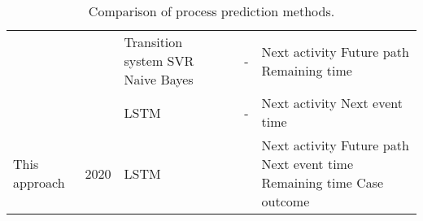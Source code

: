 \begin{table}[]
\begin{tabularx}{\textwidth}{p{3.5cm} l p{3.2cm} p{1.1cm} p{1.1cm} p{3cm}}
		 \citeauthor{DBLP:journals/computing/PolatoSBL18} \cite{DBLP:journals/computing/PolatoSBL18}&  \citeyear{DBLP:journals/computing/PolatoSBL18} &  Transition system \newline SVR \newline Naive Bayes &  \checkmark & - & Next activity  \newline Future path \newline Remaining time \\
		 
		 \citeauthor{DBLP:conf/icpm/ParkS19} \cite{DBLP:conf/icpm/ParkS19} & \citeyear{DBLP:conf/icpm/ParkS19} & LSTM & \checkmark & - &Next activity \newline Next event time  \\
		 
		 This approach &  2020 &  LSTM & \checkmark & \checkmark &  Next activity \newline Future path \newline Next event time  \newline Remaining time \newline Case outcome 
	 	\\ \bottomrule
	\end{tabularx}
	\caption{Comparison  of process prediction methods.}
	\label{tab:preliminaries}
\end{table}